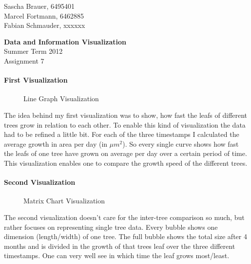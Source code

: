 \documentclass{scrartcl}
\begin{document}
Sascha Brauer, 6495401\\
Marcel Fortmann, 6462885\\
Fabian Schmauder, xxxxxx

\begin{center}
{\huge \textbf{Data and Information Visualization}}\\
Summer Term 2012\\
Assignment 7
\end{center}

\paragraph{First Visualization}

\begin{wrapfigure}{r}{0.75\textwidth}
  \begin{center}
  \end{center}
  \caption{Line Graph Visualization}
\end{wrapfigure}

The idea behind my first visualization was to show, how fast the leafs of different trees grow in relation to each other. To enable this kind of visualization the data had to be refined a little bit. For each of the three timestamps I calculated the average growth in area per day (in $\mu m^2$). So every single curve shows how fast the leafs of one tree have grown on average per day over a certain period of time. This visualization enables one to compare the growth speed of the different trees.

\paragraph{Second Visualization}

\begin{wrapfigure}{r}{0.65\textwidth}
  \begin{center}
  \end{center}
  \caption{Matrix Chart Visualization}
\end{wrapfigure}

The second visualization doesn't care for the inter-tree comparison so much, but rather focuses on representing single tree data. Every bubble shows one dimension (length/width) of one tree. The full bubble shows the total size after 4 months and is divided in the growth of that trees leaf over the three different timestamps. One can very well see in which time the leaf grows most/least.
\end{document}
